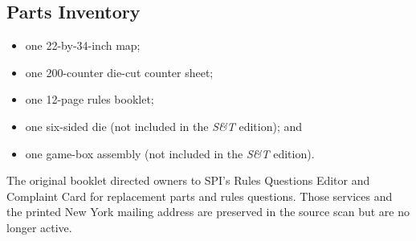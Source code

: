 \subsection{Parts Inventory}\label{sec:2.3}

\begin{itemize}
  \item one 22-by-34-inch map;
  \item one 200-counter die-cut counter sheet;
  \item one 12-page rules booklet;
  \item one six-sided die (not included in the \emph{S\&T} edition); and
  \item one game-box assembly (not included in the \emph{S\&T} edition).
\end{itemize}

\begin{historicalnote}
The original booklet directed owners to SPI's Rules Questions Editor and
Complaint Card for replacement parts and rules questions. Those services and
the printed New York mailing address are preserved in the source scan but are
no longer active.
\end{historicalnote}
